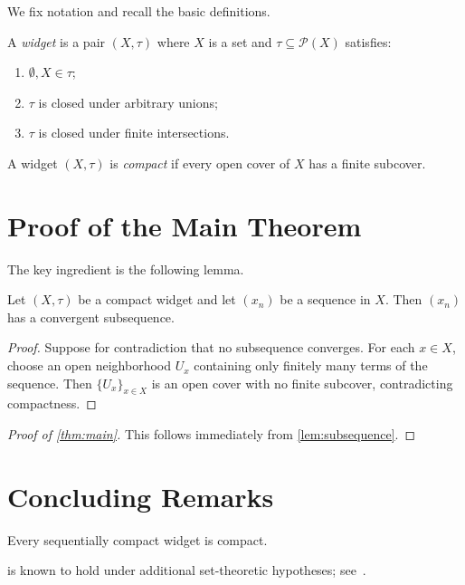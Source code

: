\documentclass[12pt]{amsart}
\begin{document}
We fix notation and recall the basic definitions.

\begin{definition}\label{def:widget}
  A \emph{widget} is a pair $(X, \tau)$ where $X$ is a set and
  $\tau \subseteq \mathcal{P}(X)$ satisfies:
  \begin{enumerate}
  \item
    $\emptyset, X \in \tau$;
  \item
    $\tau$ is closed under arbitrary unions;
  \item
    $\tau$ is closed under finite intersections.
  \end{enumerate}
\end{definition}

\begin{definition}\label{def:compact}
  A widget $(X, \tau)$ is \emph{compact} if every open cover of $X$ has a
  finite subcover.
\end{definition}


\section{Proof of the Main Theorem}\label{sec:proof}

The key ingredient is the following lemma.

\begin{lemma}\label{lem:subsequence}
  Let $(X, \tau)$ be a compact widget and let $(x_n)$ be a sequence in $X$.
  Then $(x_n)$ has a convergent subsequence.
\end{lemma}

\begin{proof}
  Suppose for contradiction that no subsequence converges.
  For each $x \in X$, choose an open neighborhood $U_x$ containing
  only finitely many terms of the sequence.
  Then $\{U_x\}_{x \in X}$ is an open cover with no finite subcover,
  contradicting compactness.
\end{proof}

\begin{proof}[Proof of \cref{thm:main}]
  This follows immediately from \cref{lem:subsequence}.
\end{proof}


\section{Concluding Remarks}\label{sec:remarks}

\begin{conjecture}\label{conj:converse}
  Every sequentially compact widget is compact.
\end{conjecture}

 is known to hold under additional set-theoretic
hypotheses;
see~\cite{Kelley:1955}.



\end{document}
